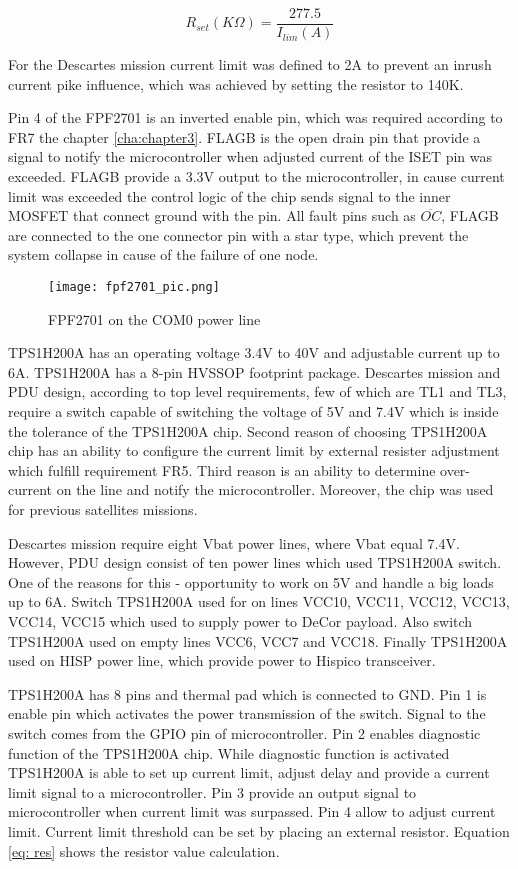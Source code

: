\begin{equation}\label{eq:fpf}
R_{set}(K\Omega) = \frac{277.5}{I_{lim}(A)}
\end{equation}

For the Descartes mission current limit was defined to 2A to prevent an inrush current pike influence, which was achieved by setting the resistor to 140K.

Pin 4 of the FPF2701 is an inverted enable pin, which was required according to FR7 the chapter \ref{cha:chapter3}. FLAGB is the open drain pin that provide a signal to notify the microcontroller when adjusted current of the ISET pin was exceeded. FLAGB provide a 3.3V output to the microcontroller, in cause current limit was exceeded the control logic of the chip sends signal to the inner MOSFET that connect ground with the pin. All fault pins such as $\overline{OC}$, FLAGB  are connected to the one connector pin with a star type, which prevent the system collapse in cause of the failure of one node.

\begin{figure}[h]
	\centering
	\texttt{[image: fpf2701\_pic.png]}
	\caption{FPF2701 on the COM0 power line}
	\label{fig: fpf27_schema}
\end{figure} 


TPS1H200A \cite{28} has an operating voltage 3.4V to 40V and adjustable current up to 6A. TPS1H200A has a 8-pin HVSSOP footprint package. Descartes mission and PDU design, according to top level requirements, few of which are TL1 and TL3, require a switch capable of switching the voltage of 5V and 7.4V which is inside the tolerance of the TPS1H200A chip. Second reason of choosing TPS1H200A chip has an ability to configure the current limit by external resister adjustment which fulfill requirement FR5. Third reason is an ability to determine over-current on the line and notify the microcontroller. Moreover, the chip was used for previous satellites missions.

Descartes mission require eight Vbat power lines, where Vbat equal 7.4V. However, PDU design consist of ten power lines which used TPS1H200A switch. One of the reasons for this - opportunity to work on 5V and handle a big loads up to 6A. Switch TPS1H200A used for on lines VCC10, VCC11, VCC12, VCC13, VCC14, VCC15 which used to supply power to DeCor payload. Also switch TPS1H200A used on empty lines VCC6, VCC7 and VCC18. Finally TPS1H200A used on HISP power line, which provide power to Hispico transceiver. 

TPS1H200A has 8 pins and thermal pad which is connected to GND. Pin 1 is enable pin which activates the power transmission of the switch. Signal to the switch comes from the GPIO pin of microcontroller. Pin 2 enables diagnostic function of the TPS1H200A chip. While diagnostic function is activated TPS1H200A is able to set up current limit, adjust delay and provide a current limit signal to a microcontroller. Pin 3 provide an output signal to microcontroller when current limit was surpassed. Pin 4 allow to adjust current limit. Current limit threshold can be set by placing an external resistor. Equation \ref{eq: res} shows the resistor value calculation.

